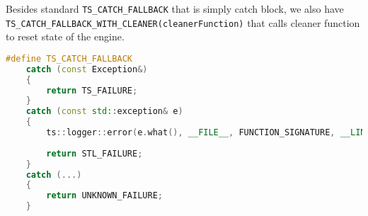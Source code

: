 \begin{itemize}
\begin{itemize}
\label{fallbacks}
Besides standard \texttt{TS\_CATCH\_FALLBACK} that is simply catch block, we also have \\
\texttt{TS\_CATCH\_FALLBACK\_WITH\_CLEANER(cleanerFunction)} that calls cleaner function to reset state of the engine.
\begin{lstlisting}[language=c++, caption=Private Engine Utils (./engine/src/internal\_utils.h)]
#define TS_CATCH_FALLBACK                                                           \
    catch (const Exception&)                                                        \
    {                                                                               \
        return TS_FAILURE;                                                          \
    }                                                                               \
    catch (const std::exception& e)                                                 \
    {                                                                               \
        ts::logger::error(e.what(), __FILE__, FUNCTION_SIGNATURE, __LINE__, false); \
                                                                                    \
        return STL_FAILURE;                                                         \
    }                                                                               \
    catch (...)                                                                     \
    {                                                                               \
        return UNKNOWN_FAILURE;                                                     \
    }


\end{lstlisting}
\end{itemize}
\end{itemize}
